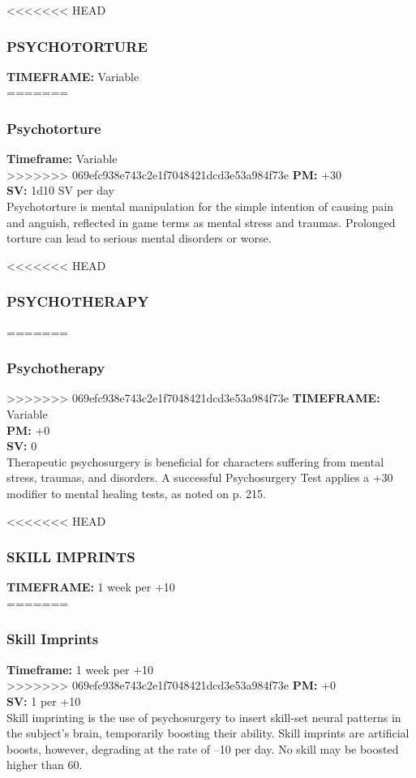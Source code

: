 <<<<<<< HEAD \subsubsection{PSYCHOTORTURE} \textbf{TIMEFRAME:} Variable \\ ======= \subsubsection{Psychotorture} \textbf{Timeframe:} Variable \\ >>>>>>> 069efc938e743c2e1f7048421dcd3e53a984f73e \textbf{PM:} +30 \\ \textbf{SV:} 1d10 SV per day \\ Psychotorture is mental manipulation for the simple intention of causing pain and anguish, reflected in game terms as mental stress and traumas. Prolonged torture can lead to serious mental disorders or worse. 

<<<<<<< HEAD \subsubsection{PSYCHOTHERAPY} ======= \subsubsection{Psychotherapy} >>>>>>> 069efc938e743c2e1f7048421dcd3e53a984f73e \textbf{TIMEFRAME:} Variable \\ \textbf{PM:} +0 \\ \textbf{SV:} 0 \\ Therapeutic psychosurgery is beneficial for characters suffering from mental stress, traumas, and disorders. A successful Psychosurgery Test applies a +30 modifier to mental healing tests, as noted on p. 215. 

<<<<<<< HEAD \subsubsection{SKILL IMPRINTS} \textbf{TIMEFRAME:} 1 week per +10 \\ ======= \subsubsection{Skill Imprints} \textbf{Timeframe:} 1 week per +10 \\ >>>>>>> 069efc938e743c2e1f7048421dcd3e53a984f73e \textbf{PM:} +0 \\ \textbf{SV:} 1 per +10 \\ Skill imprinting is the use of psychosurgery to insert skill-set neural patterns in the subject’s brain, temporarily boosting their ability. Skill imprints are artificial boosts, however, degrading at the rate of –10 per day. No skill may be boosted higher than 60. 

